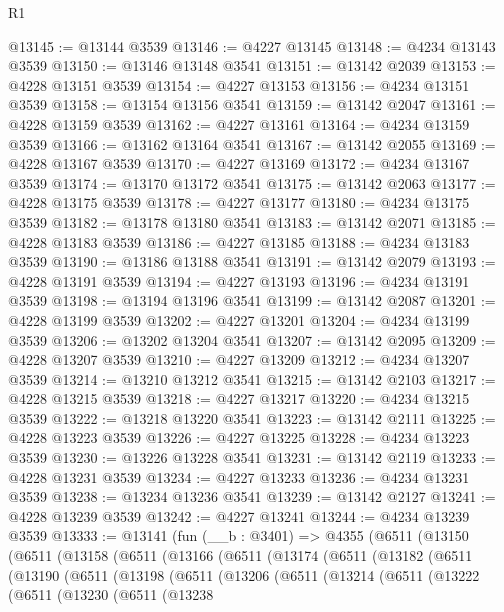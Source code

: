 \begin{lexlean}{R1}
\begin{coremodule}
@13145 := @13144 @3539
@13146 := @4227 @13145
@13148 := @4234 @13143 @3539
@13150 := @13146 @13148 @3541
@13151 := @13142 @2039
@13153 := @4228 @13151 @3539
@13154 := @4227 @13153
@13156 := @4234 @13151 @3539
@13158 := @13154 @13156 @3541
@13159 := @13142 @2047
@13161 := @4228 @13159 @3539
@13162 := @4227 @13161
@13164 := @4234 @13159 @3539
@13166 := @13162 @13164 @3541
@13167 := @13142 @2055
@13169 := @4228 @13167 @3539
@13170 := @4227 @13169
@13172 := @4234 @13167 @3539
@13174 := @13170 @13172 @3541
@13175 := @13142 @2063
@13177 := @4228 @13175 @3539
@13178 := @4227 @13177
@13180 := @4234 @13175 @3539
@13182 := @13178 @13180 @3541
@13183 := @13142 @2071
@13185 := @4228 @13183 @3539
@13186 := @4227 @13185
@13188 := @4234 @13183 @3539
@13190 := @13186 @13188 @3541
@13191 := @13142 @2079
@13193 := @4228 @13191 @3539
@13194 := @4227 @13193
@13196 := @4234 @13191 @3539
@13198 := @13194 @13196 @3541
@13199 := @13142 @2087
@13201 := @4228 @13199 @3539
@13202 := @4227 @13201
@13204 := @4234 @13199 @3539
@13206 := @13202 @13204 @3541
@13207 := @13142 @2095
@13209 := @4228 @13207 @3539
@13210 := @4227 @13209
@13212 := @4234 @13207 @3539
@13214 := @13210 @13212 @3541
@13215 := @13142 @2103
@13217 := @4228 @13215 @3539
@13218 := @4227 @13217
@13220 := @4234 @13215 @3539
@13222 := @13218 @13220 @3541
@13223 := @13142 @2111
@13225 := @4228 @13223 @3539
@13226 := @4227 @13225
@13228 := @4234 @13223 @3539
@13230 := @13226 @13228 @3541
@13231 := @13142 @2119
@13233 := @4228 @13231 @3539
@13234 := @4227 @13233
@13236 := @4234 @13231 @3539
@13238 := @13234 @13236 @3541
@13239 := @13142 @2127
@13241 := @4228 @13239 @3539
@13242 := @4227 @13241
@13244 := @4234 @13239 @3539
@13333 := @13141
    (fun (__b : @3401) =>
    @4355
      (@6511
        (@13150
          (@6511
            (@13158
              (@6511
                (@13166
                  (@6511
                    (@13174
                      (@6511
                        (@13182
                          (@6511
                            (@13190
                              (@6511
                                (@13198
                                  (@6511
                                    (@13206
                                      (@6511
                                        (@13214
                                          (@6511
                                            (@13222
                                              (@6511
                                                (@13230
                                                  (@6511
                                                    (@13238

\end{coremodule}
\end{lexlean}
